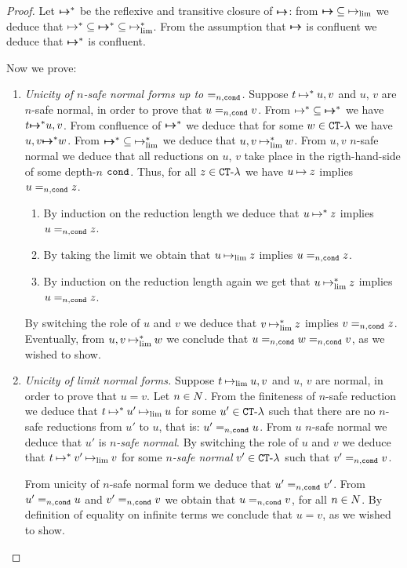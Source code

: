 \begin{proof}
Let ${ \mapsto \mspace{-17mu} \mapsto }^*$ be the reflexive and transitive closure of ${ \mapsto \mspace{-17mu} \mapsto }$:
from ${ \mapsto \mspace{-17mu} \mapsto } \subseteq \mathbin{\mapsto}_{\lim}$ we deduce that
$\mathbin{\mapsto}^* \subseteq { \mapsto \mspace{-17mu} \mapsto }^* \subseteq \mathbin{\mapsto}_{\lim}^*$.
From the assumption that ${ \mapsto \mspace{-17mu} \mapsto }$ is confluent we deduce that
${ \mapsto \mspace{-17mu} \mapsto }^*$ is confluent. 

Now we prove:

\begin{enumerate}

\item
\emph{Unicity of $n$-safe normal forms up to $=_{n,{\tt cond}}$.}
Suppose  $t \mathbin{\mapsto}^* u,v$ and $u$, $v$ are $n$-safe normal, 
in order to prove that $u=_{n,{\tt cond}}  v$.
From $\mathbin{\mapsto}^* \subseteq { \mapsto \mspace{-17mu} \mapsto }^*$ we have 
$t { \mapsto \mspace{-17mu} \mapsto }^* u,v$. From confluence of ${ \mapsto \mspace{-17mu} \mapsto }^*$
we deduce that for some $w \in { {\tt CT}\mbox{-}\lambda}$ we have $u,v { \mapsto \mspace{-17mu} \mapsto }^* w$. 
From ${ \mapsto \mspace{-17mu} \mapsto }^* \subseteq \mathbin{\mapsto}_{\lim}^*$
we deduce that $u,v \mathbin{\mapsto}_{\lim}^* w$. From $u,v$ $n$-safe normal we deduce that
all reductions on $u$, $v$ take place in the rigth-hand-side of some depth-$n$ ${\tt cond}$.
Thus, for all $z \in { {\tt CT}\mbox{-}\lambda}$ we have
 $u \mathbin{\mapsto} z$ implies $u=_{n,{\tt cond}} z$. 
\begin{enumerate} 
\item
By induction on the reduction
length we deduce that $u \mathbin{\mapsto}^* z$ implies $u=_{n,{\tt cond}} z$. 
\item
By taking the limit
we obtain that $u \mathbin{\mapsto}_{\lim} z$ implies $u=_{n,{\tt cond}} z$. 
\item
By induction on the reduction length again we get  that $u \mathbin{\mapsto}_{\lim}^* z$ implies $u=_{n,{\tt cond}} z$.
\end{enumerate}
By switching the role of $u$ and $v$ we deduce that $v \mathbin{\mapsto}_{\lim}^* z$ implies $v =_{n,{\tt cond}} z$.
Eventually, from $u,v \mathbin{\mapsto}_{\lim}^* w$ we conclude that $u=_{n,{\tt cond}} w =_{n,{\tt cond}} v$,
as we wished to show.

\item
\emph{Unicity of limit normal forms.}
Suppose  $t \mathbin{\mapsto}_{\lim} u,v$ and $u$, $v$ are normal, in order to prove that $u=v$.
Let $n \in {N}$.
From the finiteness of $n$-safe reduction we deduce that $t \mathbin{\mapsto}^* u' \mathbin{\mapsto}_{\lim} u$
for some $u' \in { {\tt CT}\mbox{-}\lambda}$ such that there are no $n$-safe reductions from
$u'$ to $u$, that is: $u' =_{n,{\tt cond}} u$. 
From $u$ $n$-safe normal we deduce that $u'$ is \emph{$n$-safe normal}.
By switching the role of $u$ and $v$ we deduce that 
$t \mathbin{\mapsto}^* v' \mathbin{\mapsto}_{\lim} v$ for some \emph{$n$-safe normal} $v' \in { {\tt CT}\mbox{-}\lambda}$ 
such that $v'=_{n,{\tt cond}} v$.

From unicity of $n$-safe normal form we deduce that $u'=_{n,{\tt cond}} v'$.
From $u' =_{n,{\tt cond}} u$ and $v' =_{n,{\tt cond}} v$ we obtain that $u =_{n,{\tt cond}} v $, for all $n \in {N}$.
By definition of equality on infinite terms we conclude that $u=v$, as we wished to show.
\end{enumerate}
\end{proof}


